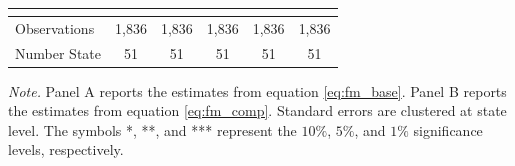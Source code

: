 \documentclass[dv_diss_main.tex]{subfiles}
\begin{document}
\begin{table}[H]
\begin{center}
{\begin{tabular}{lccccc}
    \vspace{4pt} & \begin{footnotesize}\end{footnotesize} & \begin{footnotesize}\end{footnotesize} & \begin{footnotesize}\end{footnotesize} & \begin{footnotesize}\end{footnotesize} & \begin{footnotesize}\end{footnotesize} \\
    \hline
    Observations & 1,836 & 1,836 & 1,836 & 1,836 & 1,836 \\
    Number State & 51 & 51 & 51 & 51 & 51 \\
   \hline

    \end{tabular}
    }
   
    \end{center}
        
    \footnotesize{\textit{Note. }Panel A reports the estimates from equation \eqref{eq:fm_base}. Panel B reports the estimates from equation \eqref{eq:fm_comp}. Standard errors are clustered at state level. The symbols *, **, and *** represent the $10\%$, $5\%$, and $1\%$ significance levels, respectively.}
\end{table}
\end{document}
